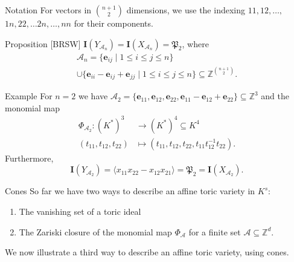 \documentclass[mathserif,handout]{beamer}
\newcommand{\pr}{\mathfrak P}
\newcommand{\vect}[1]{\mathbf#1}
\newcommand{\Z}{\mathbb Z}
\begin{document}
\begin{frame}
\begin{block}{Notation}
For vectors in $\binom{n+1}{2}$ dimensions, we use the indexing $11,12,\dots,$ $1n,22,\dots 2n,\dots,nn$ for their components.
\end{block}

\begin{block}{Proposition [BRSW]}
$\vect I(Y_{\mathscr A_n})=\vect I(X_{\mathscr A_n})=\pr_2$, where 
\begin{multline*}
\mathscr A_n = \{\vect e_{ij}\mid 1\leq i\leq j\leq n\} \\
\cup \{\vect e_{ii}-\vect e_{ij}+\vect e_{jj}\mid 1\leq i\leq j\leq n\}\subseteq \Z^{\binom{n+1}{2}}.
\end{multline*}
\end{block}
\end{frame}

\begin{frame}
\begin{block}{Example}
For $n=2$ we have 
$\mathscr A_2 = \{\vect e_{11},\vect e_{12},\vect e_{22},\vect e_{11}-\vect e_{12}+\vect e_{22}\}\subseteq\Z^3
$ %
and the monomial map
\begin{align*}
\Phi_{\mathscr A_2}: (K^*)^3 &\to (K^*)^4\subseteq K^4 \\
(t_{11},t_{12},t_{22}) &\mapsto (t_{11},t_{12},t_{22},t_{11}t_{12}^{-1}t_{22}).
\end{align*} Furthermore, 
\[
\vect I(Y_{\mathscr A_2})= \langle x_{11}x_{22}-x_{12}x_{21}\rangle=\pr_2=\vect I(X_{\mathscr A_2}).
\]
\end{block}
\end{frame}


\begin{frame}
{Cones}%
So far we have two ways to describe an affine toric variety in $K^s$:


\begin{enumerate}[]
\item The vanishing set of a toric ideal


\item The Zariski closure of the monomial map $\Phi_{\mathscr{A}}$ for a finite set $\mathscr A\subseteq \Z^d$.
\end{enumerate}


We now illustrate a third way to describe an affine toric variety, using cones.
\end{frame}
\end{document}
